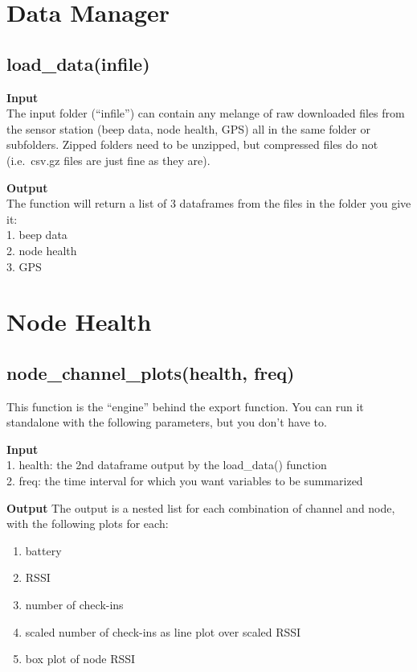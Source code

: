 \documentclass[
]{book}
\providecommand{\tightlist}{%
  \setlength{\itemsep}{0pt}\setlength{\parskip}{0pt}}
\begin{document}
\hypertarget{data-manager}{%
\section{Data Manager}\label{data-manager}}

\hypertarget{load_datainfile}{%
\subsection{load\_data(infile)}\label{load_datainfile}}

\textbf{Input}\\
The input folder (``infile'') can contain any melange of raw downloaded files from the sensor station (beep data, node health, GPS) all in the same folder or subfolders. Zipped folders need to be unzipped, but compressed files do not (i.e.~csv.gz files are just fine as they are).

\textbf{Output}\\
The function will return a list of 3 dataframes from the files in the folder you give it:\\
1. beep data\\
2. node health\\
3. GPS

\hypertarget{node-health}{%
\section{Node Health}\label{node-health}}

\hypertarget{node_channel_plotshealth-freq}{%
\subsection{node\_channel\_plots(health, freq)}\label{node_channel_plotshealth-freq}}

This function is the ``engine'' behind the export function. You can run it standalone with the following parameters, but you don't have to.

\textbf{Input}\\
1. health: the 2nd dataframe output by the load\_data() function\\
2. freq: the time interval for which you want variables to be summarized

\textbf{Output}
The output is a nested list for each combination of channel and node, with the following plots for each:

\begin{enumerate}
\def\labelenumi{\arabic{enumi}.}
\tightlist
\item
  battery\\
\item
  RSSI\\
\item
  number of check-ins\\
\item
  scaled number of check-ins as line plot over scaled RSSI\\
\item
  box plot of node RSSI
\end{enumerate}
\end{document}
